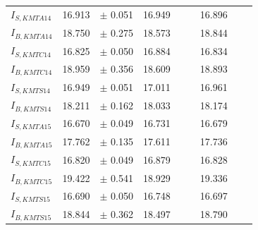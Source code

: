 \begin{tabular}{lllllllll}
$I_{S, KMTA14}$ &      16.913 &       $\pm$ 0.051 &            16.949 &                          &                          &                16.896 &                              &                              \\
$I_{B, KMTA14}$ &      18.750 &       $\pm$ 0.275 &            18.573 &                          &                          &                18.844 &                              &                              \\
$I_{S, KMTC14}$ &      16.825 &       $\pm$ 0.050 &            16.884 &                          &                          &                16.834 &                              &                              \\
$I_{B, KMTC14}$ &      18.959 &       $\pm$ 0.356 &            18.609 &                          &                          &                18.893 &                              &                              \\
$I_{S, KMTS14}$ &      16.949 &       $\pm$ 0.051 &            17.011 &                          &                          &                16.961 &                              &                              \\
$I_{B, KMTS14}$ &      18.211 &       $\pm$ 0.162 &            18.033 &                          &                          &                18.174 &                              &                              \\
$I_{S, KMTA15}$ &      16.670 &       $\pm$ 0.049 &            16.731 &                          &                          &                16.679 &                              &                              \\
$I_{B, KMTA15}$ &      17.762 &       $\pm$ 0.135 &            17.611 &                          &                          &                17.736 &                              &                              \\
$I_{S, KMTC15}$ &      16.820 &       $\pm$ 0.049 &            16.879 &                          &                          &                16.828 &                              &                              \\
$I_{B, KMTC15}$ &      19.422 &       $\pm$ 0.541 &            18.929 &                          &                          &                19.336 &                              &                              \\
$I_{S, KMTS15}$ &      16.690 &       $\pm$ 0.050 &            16.748 &                          &                          &                16.697 &                              &                              \\
$I_{B, KMTS15}$ &      18.844 &       $\pm$ 0.362 &            18.497 &                          &                          &                18.790 &                              &                              \\
\bottomrule
\end{tabular}
